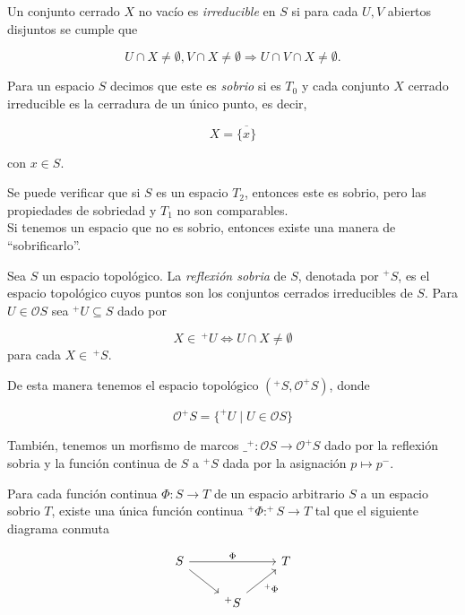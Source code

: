 \begin{dfn}\label{irreducible}
    Un conjunto cerrado $X$ no vacío es \emph{irreducible} en $S$ si para cada $U, V$ abiertos disjuntos se cumple que 

    \[
    U\cap X\neq \emptyset, V\cap X\neq \emptyset \Rightarrow U\cap V\cap X\neq \emptyset.
    \]
\end{dfn}

\begin{dfn}\label{sobrio}
    Para un espacio $S$ decimos que este es \emph{sobrio} si es $T_0$ y cada conjunto $X$ cerrado irreducible es la cerradura de un único punto, es decir,

    \[
    X=\overline{\{x\}}
    \]

    con $x\in S$.
\end{dfn}

Se puede verificar que si $S$ es un espacio $T_2$, entonces este es sobrio, pero las propiedades de sobriedad y $T_1$ no son comparables.\\

Si tenemos un espacio que no es sobrio, entonces existe una manera de ``sobrificarlo''.

\begin{dfn}\label{Reflexion sobria}
    Sea $S$ un espacio topológico. La \emph{reflexión sobria} de $S$, denotada por $^+S$, es el espacio topológico cuyos puntos son los conjuntos cerrados irreducibles de $S$. Para $U\in \mathcal{O}S$ sea $^+U\subseteq S$ dado por 

    \[
    X\in\, ^+U \Leftrightarrow U\cap X\neq \emptyset
    \]
para cada $X\in\,^+S$. 
\end{dfn}

De esta manera tenemos el espacio topológico $(^+S, \mathcal{O}^+S)$, donde 

\[
\mathcal{O}^+S=\{^+U\mid U\in \mathcal{O}S\}
\]

También, tenemos un morfismo de marcos $\_ ^+\colon \mathcal{O}S\to \mathcal{O} ^+S$ dado por la reflexión sobria y la función continua de $S$ a $^+S$ dada por la asignación $p\mapsto p^-$.

\begin{lem}
    Para cada función continua $\Phi\colon S\to T$ de un espacio arbitrario $S$ a un espacio sobrio $T$, existe una única función continua $^+\Phi\colon ^+S\to T$ tal que el siguiente diagrama conmuta

    \[\begin{tikzcd}
	S && T \\
	& {^+S}
	\arrow["\Phi", from=1-1, to=1-3]
	\arrow[from=1-1, to=2-2]
	\arrow["{^+\Phi}"', from=2-2, to=1-3]
\end{tikzcd}\]
\end{lem}

